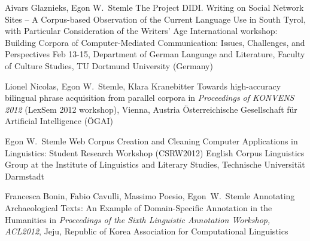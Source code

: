 \documentclass[11pt,a4paper]{moderncv}
\begin{document}
        {Aivars Glaznieks, Egon W.~Stemle}
        {\small The Project DIDI. Writing on Social Network Sites – A
        Corpus-based Observation of the Current Language Use in South Tyrol,
        with Particular Consideration of the Writers’ Age} 
        {\small International workshop: Building Corpora of Computer-Mediated
        Communication: Issues, Challenges, and Perspectives}
        {\small Feb 13-15, Department of German Language and Literature, Faculty of
        Culture Studies, TU Dortmund University (Germany)}
        {}



        {Lionel Nicolas, Egon W.~Stemle, Klara Kranebitter}
        {\small Towards high-accuracy bilingual phrase acquisition from parallel corpora}
        {\small in {\em Proceedings of KONVENS 2012} (LexSem 2012 workshop), Vienna, Austria}
        {\small \"{O}sterreichische Gesellschaft f\"{u}r Artificial Intelligence (\"{O}GAI)}
        {}
    
        {Egon W.~Stemle}
        {Web Corpus Creation and Cleaning}
        {\small Computer Applications in Linguistics: Student Research Workshop (CSRW2012)}
        {\small English Corpus Linguistics Group at the Institute of
        Linguistics and Literary Studies, Technische Universit\"{a}t Darmstadt}
        {}

        {Francesca Bonin, Fabio Cavulli, Massimo Poesio, Egon~W.~Stemle}
        {\small Annotating Archaeological Texts: An Example of
        Domain-Specific Annotation in the Humanities}
        {\small in {\em Proceedings of the Sixth Linguistic Annotation
        Workshop, ACL2012}, Jeju, Republic of Korea}
        {\small Association for Computational Linguistics}
        {}
\end{document}
